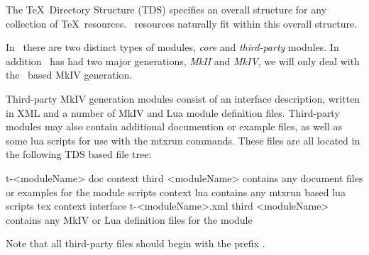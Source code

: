 
\startchapter[title=Logistics]

\startsection[title=Where to put things]

The \TeX\ Directory Structure (TDS) specifies an overall structure for any 
collection of \TeX\ resources. \ConTeXt\ resources naturally fit within this 
overall structure. 

In \ConTeXt\ there are two distinct types of modules, \emph{core} and 
\emph{third-party} modules. In addition \ConTeXt\ has had two major 
generations, \emph{MkII} and \emph{MkIV}, we will only deal with the \LuaTeX\ 
based MkIV generation. 

Third-party MkIV generation modules consist of an interface description, 
written in XML and a number of MkIV and Lua module definition files. 
Third-party modules may also contain additional documention or example files, 
as well as some lua scripts for use with the mtxrun commands. These files are 
all located in the following TDS based file tree: 

\starttyping

t-<moduleName>
  doc
    context
      third
        <moduleName>
          {contains any document files or examples for the module}
  scripts
    context
      lua
        {contains any mtxrun based lua scripts}
  tex
    context
      interface
        t-<moduleName>.xml
      third
        <moduleName>
          {contains any MkIV or Lua definition files for the module}

\stoptyping

Note that all third-party files should begin with the prefix . 

\stopsection

\stopchapter
